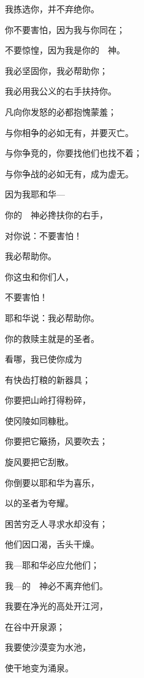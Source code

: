 {\par }{\Q 我拣选你，并不弃绝你。
\par }{\Q {}你不要害怕，因为我与你同在；
\par }{\Q 不要惊惶，因为我是你的　神。
\par }{\Q 我必坚固你，我必帮助你；
\par }{\Q 我必用我公义的右手扶持你。
\par }{\BB \par }{\Q {}凡向你发怒的必都抱愧蒙羞；
\par }{\Q 与你相争的必如无有，并要灭亡。
\par }{\Q {}与你争竞的，你要找他们也找不着；
\par }{\Q 与你争战的必如无有，成为虚无。
\par }{\Q {}因为我耶和华—
\par }{\Q 你的　神必搀扶你的右手，
\par }{\Q 对你说：不要害怕！
\par }{\Q 我必帮助你。
\par }{\BB \par }{\Q {}你这虫{}和你们{}人，
\par }{\Q 不要害怕！
\par }{\Q 耶和华说：我必帮助你。
\par }{\Q 你的救赎主就是{}的圣者。
\par }{\Q {}看哪，我已使你成为
\par }{\Q 有快齿打粮的新器具；
\par }{\Q 你要把山岭打得粉碎，
\par }{\Q 使冈陵如同糠秕。
\par }{\Q {}你要把它簸扬，风要吹去；
\par }{\Q 旋风要把它刮散。
\par }{\Q 你倒要以耶和华为喜乐，
\par }{\Q 以{}的圣者为夸耀。
\par }{\BB \par }{\Q {}困苦穷乏人寻求水却没有；
\par }{\Q 他们因口渴，舌头干燥。
\par }{\Q 我—耶和华必应允他们；
\par }{\Q 我—{}的　神必不离弃他们。
\par }{\Q {}我要在净光的高处开江河，
\par }{\Q 在谷中开泉源；
\par }{\Q 我要使沙漠变为水池，
\par }{\Q 使干地变为涌泉。
}
